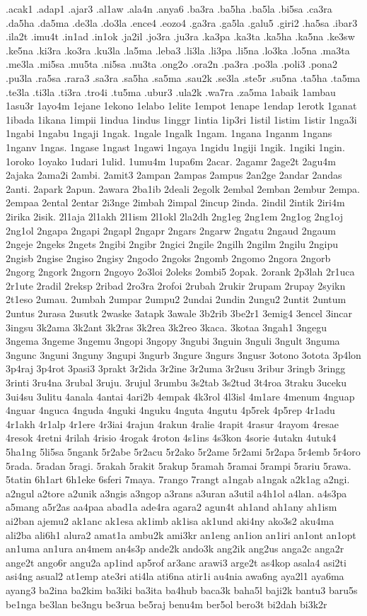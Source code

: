 {.acak1 .adap1 .ajar3 .al1aw .ala4n .anya6 .ba3ra .ba5ha .ba5la .bi5sa .ca3ra .da5ha .da5ma .de3la .do3la .ence4 .eozo4 .ga3ra .ga5la .galu5 .giri2 .ha5sa .ibar3 .ila2t .imu4t .in1ad .in1ok .ja2il .jo3ra .ju3ra .ka3pa .ka3ta .ka5ha .ka5na .ke3sw .ke5na .ki3ra .ko3ra .ku3la .la5ma .leba3 .li3la .li3pa .li5na .lo3ka .lo5na .ma3ta .me3la .mi5sa .mu5ta .ni5sa .nu3ta .ong2o .ora2n .pa3ra .po3la .poli3 .pona2 .pu3la .ra5sa .rara3 .sa3ra .sa5ha .sa5ma .sau2k .se3la .ste5r .su5na .ta5ha .ta5ma .te3la .ti3la .ti3ra .tro4i .tu5ma .ubur3 .ula2k .wa7ra .za5ma 1abaik 1ambau 1asu3r 1ayo4m 1ejane 1ekono 1elabo 1elite 1empot 1enape 1endap 1erotk 1ganat 1ibada 1ikana 1impii 1indua 1indus 1inggr 1intia 1ip3ri 1istil 1istim 1istir 1nga3i 1ngabi 1ngabu 1ngaji 1ngak. 1ngale 1ngalk 1ngam. 1ngana 1nganm 1ngans 1nganv 1ngas. 1ngase 1ngast 1ngawi 1ngaya 1ngidu 1ngiji 1ngik. 1ngiki 1ngin. 1oroko 1oyako 1udari 1ulid. 1umu4m 1upa6m 2acar. 2agamr 2age2t 2agu4m 2ajaka 2ama2i 2ambi. 2amit3 2ampan 2ampas 2ampus 2an2ge 2andar 2andas 2anti. 2apark 2apun. 2awara 2ba1ib 2deali 2egolk 2embal 2emban 2embur 2empa. 2empaa 2ental 2entar 2i3nge 2imbah 2impal 2incup 2inda. 2indil 2intik 2iri4m 2irika 2isik. 2l1aja 2l1akh 2l1ism 2l1okl 2la2dh 2ng1eg 2ng1em 2ng1og 2ng1oj 2ng1ol 2ngapa 2ngapi 2ngapl 2ngapr 2ngars 2ngarw 2ngatu 2ngaud 2ngaum 2ngeje 2ngeks 2ngets 2ngibi 2ngibr 2ngici 2ngile 2ngilh 2ngilm 2ngilu 2ngipu 2ngisb 2ngise 2ngiso 2ngisy 2ngodo 2ngoks 2ngomb 2ngomo 2ngora 2ngorb 2ngorg 2ngork 2ngorn 2ngoyo 2o3loi 2oleks 2ombi5 2opak. 2orank 2p3lah 2r1uca 2r1ute 2radil 2reksp 2ribad 2ro3ra 2rofoi 2rubah 2rukir 2rupam 2rupay 2syikn 2t1eso 2umau. 2umbah 2umpar 2umpu2 2undai 2undin 2ungu2 2untit 2untum 2untus 2urasa 2usutk 2waske 3atapk 3awale 3b2rib 3be2r1 3emig4 3encel 3incar 3ingsu 3k2ama 3k2ant 3k2ras 3k2rea 3k2reo 3kaca. 3kotaa 3ngah1 3ngegu 3ngema 3ngeme 3ngemu 3ngopi 3ngopy 3ngubi 3nguin 3nguli 3ngult 3nguma 3ngunc 3nguni 3nguny 3ngupi 3ngurb 3ngure 3ngurs 3ngusr 3otono 3otota 3p4lon 3p4raj 3p4rot 3pasi3 3prakt 3r2ida 3r2ine 3r2uma 3r2usu 3ribur 3ringb 3ringg 3rinti 3ru4na 3rubal 3ruju. 3rujul 3rumbu 3s2tab 3s2tud 3t4roa 3traku 3uceku 3ui4su 3ulitu 4anala 4antai 4ari2b 4empak 4k3rol 4l3isl 4m1are 4menum 4nguap 4nguar 4nguca 4nguda 4nguki 4nguku 4nguta 4ngutu 4p5rek 4p5rep 4r1adu 4r1akh 4r1alp 4r1ere 4r3iai 4rajun 4rakun 4ralie 4rapit 4rasur 4rayom 4resae 4resok 4retni 4rilah 4risio 4rogak 4roton 4s1ins 4s3kon 4sorie 4utakn 4utuk4 5ha1ng 5li5sa 5ngank 5r2abe 5r2acu 5r2ako 5r2ame 5r2ami 5r2apa 5r4emb 5r4oro 5rada. 5radan 5ragi. 5rakah 5rakit 5rakup 5ramah 5ramai 5rampi 5rariu 5rawa. 5tatin 6h1art 6h1eke 6sferi 7maya. 7rango 7rangt a1ngab a1ngak a2k1ag a2ngi. a2ngul a2tore a2unik a3ngis a3ngop a3rans a3uran a3util a4h1ol a4lan. a4s3pa a5mang a5r2as aa4paa abad1a ade4ra agara2 agun4t ah1and ah1any ah1ism ai2ban ajemu2 ak1anc ak1esa ak1imb ak1isa ak1und aki4ny ako3s2 aku4ma ali2ba ali6h1 alura2 amat1a ambu2k ami3kr an1eng an1ion an1iri an1ont an1opt an1uma an1ura an4mem an4s3p ande2k ando3k ang2ik ang2us anga2c anga2r ange2t ango6r angu2a ap1ind ap5rof ar3anc arawi3 arge2t as4kop asala4 asi2ti asi4ng asual2 at1emp ate3ri ati4la ati6na atir1i au4nia awa6ng aya2l1 aya6ma ayang3 ba2ina ba2kim ba3iki ba3ita ba4hub baca3k baha5l baji2k bantu3 baru5s be1nga be3lan be3ngu be3rua be5raj benu4m ber5ol bero3t bi2dah bi3k2r }
